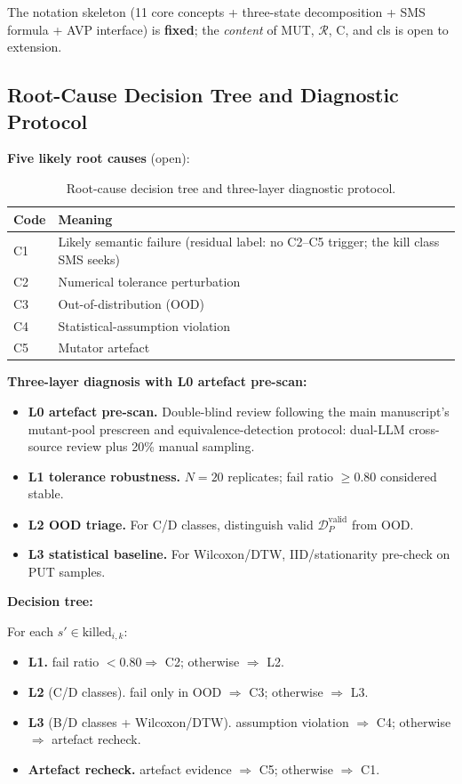 \documentclass[review,12pt,authoryear]{elsarticle}
\begin{document}
The notation skeleton (11 core concepts + three-state decomposition +
SMS formula + AVP interface) is \textbf{fixed}; the \emph{content} of
MUT, $\mathcal{R}$, C, and cls is open to extension.

\subsection{Root-Cause Decision Tree and Diagnostic Protocol}\label{a.2-lrca-decision-tree-and-three-layer-diagnostic-protocol}

\textbf{Five likely root causes} (open):

{\def\LTcaptype{table} %
\begin{longtable}[]{@{}ll@{}}
\caption{Root-cause decision tree and three-layer diagnostic protocol.}\label{tab:p2-15}\\
\toprule\noalign{}
Code & Meaning \\
\midrule\noalign{}
\endfirsthead
\endhead
\bottomrule\noalign{}
\endlastfoot
C1 & Likely semantic failure (residual label: no C2--C5 trigger; the
kill class SMS seeks) \\
C2 & Numerical tolerance perturbation \\
C3 & Out-of-distribution (OOD) \\
C4 & Statistical-assumption violation \\
C5 & Mutator artefact \\
\end{longtable}
}

\textbf{Three-layer diagnosis with L0 artefact pre-scan:}

\begin{itemize}
\item \textbf{L0 artefact pre-scan.} Double-blind review following the main manuscript's mutant-pool prescreen and equivalence-detection protocol: dual-LLM cross-source review plus 20\% manual sampling.
\item \textbf{L1 tolerance robustness.} $N = 20$ replicates; fail ratio $\geq 0.80$ considered stable.
\item \textbf{L2 OOD triage.} For C/D classes, distinguish valid $\mathcal{D}_P^{\text{valid}}$ from OOD.
\item \textbf{L3 statistical baseline.} For Wilcoxon/DTW, IID/stationarity pre-check on PUT samples.
\end{itemize}

\textbf{Decision tree:}

For each $s' \in \mathrm{killed}_{i,k}$:
\begin{itemize}
\item \textbf{L1.} fail ratio $< 0.80 \Rightarrow$ C2; otherwise $\Rightarrow$ L2.
\item \textbf{L2} (C/D classes). fail only in OOD $\Rightarrow$ C3; otherwise $\Rightarrow$ L3.
\item \textbf{L3} (B/D classes + Wilcoxon/DTW). assumption violation $\Rightarrow$ C4; otherwise $\Rightarrow$ artefact recheck.
\item \textbf{Artefact recheck.} artefact evidence $\Rightarrow$ C5; otherwise $\Rightarrow$ C1.
\end{itemize}
\end{document}
